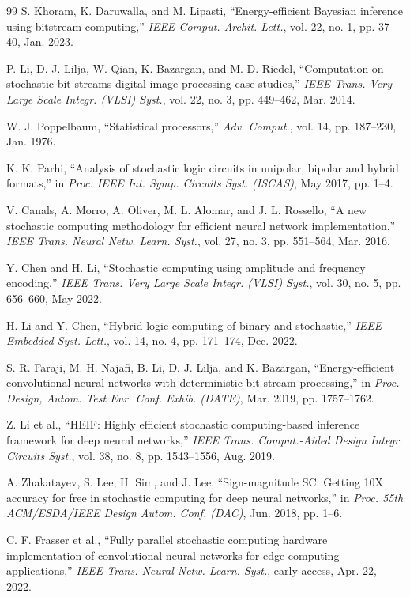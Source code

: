 \documentclass{solitairemiya-art}
\begin{document}
\begin{thebibliography}{99}
 S. Khoram, K. Daruwalla, and M. Lipasti, ``Energy-efficient Bayesian inference using bitstream computing,'' \textit{IEEE Comput. Archit. Lett.}, vol. 22, no. 1, pp. 37--40, Jan. 2023.

 P. Li, D. J. Lilja, W. Qian, K. Bazargan, and M. D. Riedel, ``Computation on stochastic bit streams digital image processing case studies,'' \textit{IEEE Trans. Very Large Scale Integr. (VLSI) Syst.}, vol. 22, no. 3, pp. 449--462, Mar. 2014.

 W. J. Poppelbaum, ``Statistical processors,'' \textit{Adv. Comput.}, vol. 14, pp. 187--230, Jan. 1976.

 K. K. Parhi, ``Analysis of stochastic logic circuits in unipolar, bipolar and hybrid formats,'' in \textit{Proc. IEEE Int. Symp. Circuits Syst. (ISCAS)}, May 2017, pp. 1--4.

 V. Canals, A. Morro, A. Oliver, M. L. Alomar, and J. L. Rossello, ``A new stochastic computing methodology for efficient neural network implementation,'' \textit{IEEE Trans. Neural Netw. Learn. Syst.}, vol. 27, no. 3, pp. 551--564, Mar. 2016.

 Y. Chen and H. Li, ``Stochastic computing using amplitude and frequency encoding,'' \textit{IEEE Trans. Very Large Scale Integr. (VLSI) Syst.}, vol. 30, no. 5, pp. 656--660, May 2022.

 H. Li and Y. Chen, ``Hybrid logic computing of binary and stochastic,'' \textit{IEEE Embedded Syst. Lett.}, vol. 14, no. 4, pp. 171--174, Dec. 2022.

 S. R. Faraji, M. H. Najafi, B. Li, D. J. Lilja, and K. Bazargan, ``Energy-efficient convolutional neural networks with deterministic bit-stream processing,'' in \textit{Proc. Design, Autom. Test Eur. Conf. Exhib. (DATE)}, Mar. 2019, pp. 1757--1762.

 Z. Li et al., ``HEIF: Highly efficient stochastic computing-based inference framework for deep neural networks,'' \textit{IEEE Trans. Comput.-Aided Design Integr. Circuits Syst.}, vol. 38, no. 8, pp. 1543--1556, Aug. 2019.

 A. Zhakatayev, S. Lee, H. Sim, and J. Lee, ``Sign-magnitude SC: Getting 10X accuracy for free in stochastic computing for deep neural networks,'' in \textit{Proc. 55th ACM/ESDA/IEEE Design Autom. Conf. (DAC)}, Jun. 2018, pp. 1--6.

 C. F. Frasser et al., ``Fully parallel stochastic computing hardware implementation of convolutional neural networks for edge computing applications,'' \textit{IEEE Trans. Neural Netw. Learn. Syst.}, early access, Apr. 22, 2022.


\end{thebibliography}
\end{document}
